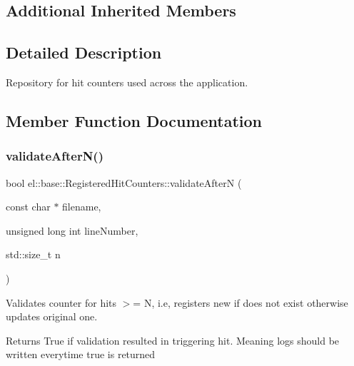 \subsection*{Additional Inherited Members}


\subsection{Detailed Description}
Repository for hit counters used across the application. 

\subsection{Member Function Documentation}
\mbox{\label{classel_1_1base_1_1_registered_hit_counters_af6fa32ffd76776863d8bd2f0e9b341fc}} 
\subsubsection{\texorpdfstring{validate\+After\+N()}{validateAfterN()}}
{\footnotesize\ttfamily bool el\+::base\+::\+Registered\+Hit\+Counters\+::validate\+AfterN (\begin{DoxyParamCaption}\item[{const char $\ast$}]{filename,  }\item[{unsigned long int}]{line\+Number,  }\item[{std\+::size\+\_\+t}]{n }\end{DoxyParamCaption})\hspace{0.3cm}{\ttfamily [inline]}}



Validates counter for hits $>$= N, i.\+e, registers new if does not exist otherwise updates original one. 

\begin{DoxyReturn}{Returns}
True if validation resulted in triggering hit. Meaning logs should be written everytime true is returned 
\end{DoxyReturn}
\mbox{\label{classel_1_1base_1_1_registered_hit_counters_a18fecedc6be778cfd63e30cc42fb9c82}} 
